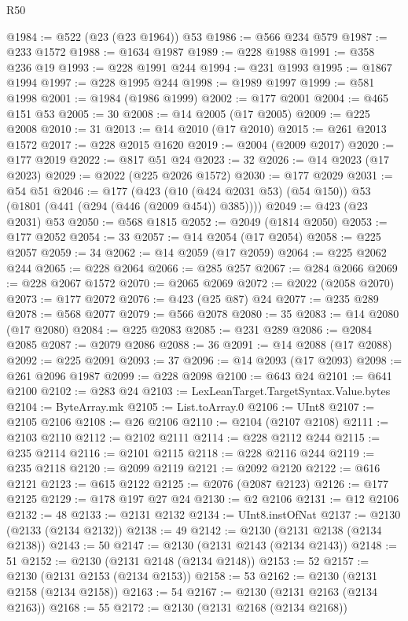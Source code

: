 \begin{lexlean}{R50}
\begin{coremodule}
@1984 := @522 (@23 (@23 @1964)) @53
@1986 := @566 @234 @579
@1987 := @233 @1572
@1988 := @1634 @1987
@1989 := @228 @1988
@1991 := @358 @236 @19
@1993 := @228 @1991 @244
@1994 := @231 @1993
@1995 := @1867 @1994
@1997 := @228 @1995 @244
@1998 := @1989 @1997
@1999 := @581 @1998
@2001 := @1984 (@1986 @1999)
@2002 := @177 @2001
@2004 := @465 @151 @53
@2005 := 30
@2008 := @14 @2005 (@17 @2005)
@2009 := @225 @2008
@2010 := 31
@2013 := @14 @2010 (@17 @2010)
@2015 := @261 @2013 @1572
@2017 := @228 @2015 @1620
@2019 := @2004 (@2009 @2017)
@2020 := @177 @2019
@2022 := @817 @51 @24
@2023 := 32
@2026 := @14 @2023 (@17 @2023)
@2029 := @2022 (@225 @2026 @1572)
@2030 := @177 @2029
@2031 := @54 @51
@2046 := @177
    (@423 (@10 (@424 @2031 @53) (@54 @150)) @53 (@1801 (@441 (@294 (@446 (@2009 @454)) @385))))
@2049 := @423 (@23 @2031) @53
@2050 := @568 @1815
@2052 := @2049 (@1814 @2050)
@2053 := @177 @2052
@2054 := 33
@2057 := @14 @2054 (@17 @2054)
@2058 := @225 @2057
@2059 := 34
@2062 := @14 @2059 (@17 @2059)
@2064 := @225 @2062 @244
@2065 := @228 @2064
@2066 := @285 @257
@2067 := @284 @2066
@2069 := @228 @2067 @1572
@2070 := @2065 @2069
@2072 := @2022 (@2058 @2070)
@2073 := @177 @2072
@2076 := @423 (@25 @87) @24
@2077 := @235 @289
@2078 := @568 @2077
@2079 := @566 @2078
@2080 := 35
@2083 := @14 @2080 (@17 @2080)
@2084 := @225 @2083
@2085 := @231 @289
@2086 := @2084 @2085
@2087 := @2079 @2086
@2088 := 36
@2091 := @14 @2088 (@17 @2088)
@2092 := @225 @2091
@2093 := 37
@2096 := @14 @2093 (@17 @2093)
@2098 := @261 @2096 @1987
@2099 := @228 @2098
@2100 := @643 @24
@2101 := @641 @2100
@2102 := @283 @24
@2103 := LexLeanTarget.TargetSyntax.Value.bytes
@2104 := ByteArray.mk
@2105 := List.toArray.{0}
@2106 := UInt8
@2107 := @2105 @2106
@2108 := @26 @2106
@2110 := @2104 (@2107 @2108)
@2111 := @2103 @2110
@2112 := @2102 @2111
@2114 := @228 @2112 @244
@2115 := @235 @2114
@2116 := @2101 @2115
@2118 := @228 @2116 @244
@2119 := @235 @2118
@2120 := @2099 @2119
@2121 := @2092 @2120
@2122 := @616 @2121
@2123 := @615 @2122
@2125 := @2076 (@2087 @2123)
@2126 := @177 @2125
@2129 := @178 @197 @27 @24
@2130 := @2 @2106
@2131 := @12 @2106
@2132 := 48
@2133 := @2131 @2132
@2134 := UInt8.instOfNat
@2137 := @2130 (@2133 (@2134 @2132))
@2138 := 49
@2142 := @2130 (@2131 @2138 (@2134 @2138))
@2143 := 50
@2147 := @2130 (@2131 @2143 (@2134 @2143))
@2148 := 51
@2152 := @2130 (@2131 @2148 (@2134 @2148))
@2153 := 52
@2157 := @2130 (@2131 @2153 (@2134 @2153))
@2158 := 53
@2162 := @2130 (@2131 @2158 (@2134 @2158))
@2163 := 54
@2167 := @2130 (@2131 @2163 (@2134 @2163))
@2168 := 55
@2172 := @2130 (@2131 @2168 (@2134 @2168))

\end{coremodule}
\end{lexlean}
